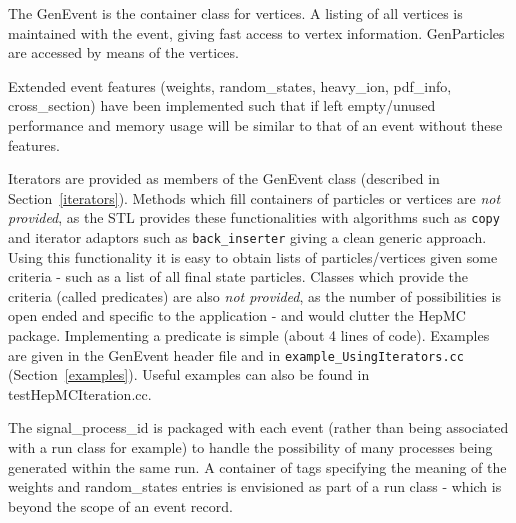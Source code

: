 \documentclass[11pt,letterpaper]{article}
\begin{document}
The GenEvent is the container class for vertices. 
A listing of all vertices is maintained with the event, giving fast
access to vertex information. GenParticles are accessed by means of the
vertices.

Extended event features 
(weights, random\_states, heavy\_ion, pdf\_info, cross\_section) 
have been implemented such that if left empty/unused performance and memory
usage will be similar to that of an event without these features.

Iterators are provided as members of the GenEvent class
(described in Section~\ref{iterators}). Methods which fill containers of
particles or vertices are {\it not provided}, as the STL provides these
functionalities with algorithms such as \verb!copy! and iterator adaptors
such as \verb!back_inserter! giving a clean generic approach.
Using this functionality it is easy to obtain lists of
particles/vertices given some criteria - such as a list of all final
state particles. Classes which provide the criteria (called
predicates) are also {\it not provided}, as the number of
possibilities is open ended and specific to the application -
and would clutter the HepMC package. Implementing a predicate is
simple (about 4 lines of code).
Examples are given in the GenEvent header file and in
\verb!example_UsingIterators.cc! (Section~\ref{examples}).
Useful examples can also be found in testHepMCIteration.cc.

The signal\_process\_id is packaged with each event (rather than being
associated with a run class for example) to handle the possibility of
many processes being generated within the same run. A container of
tags specifying the meaning of the weights and random\_states entries
is envisioned as part of a run class - which is beyond the scope of an
event record.

%
%
\end{document}
